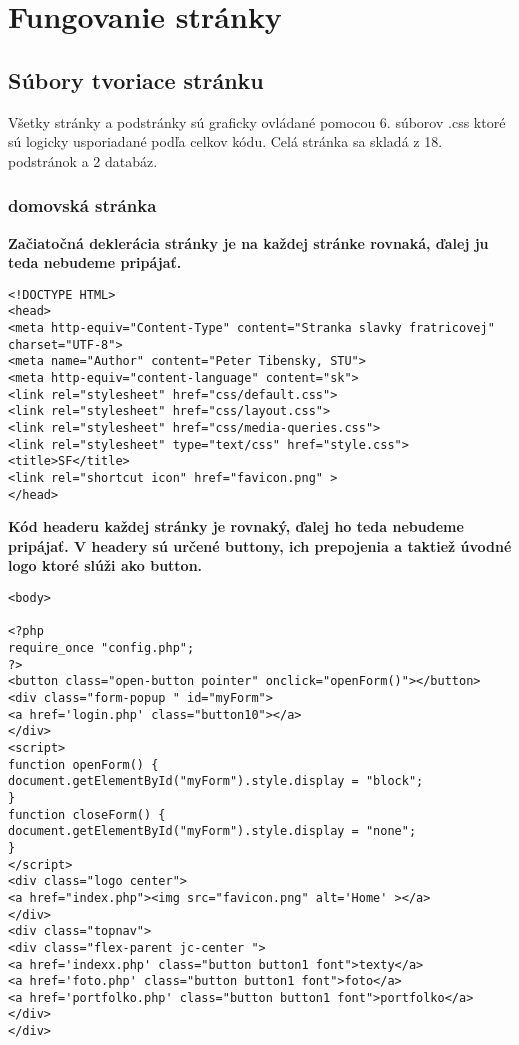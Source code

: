 \chapter{Fungovanie stránky}
\section{Súbory tvoriace stránku}

Všetky stránky a podstránky sú graficky ovládané pomocou 6. súborov .css ktoré sú logicky usporiadané podľa celkov kódu. Celá stránka sa skladá z 18. podstránok a 2 databáz.

\subsection{domovská stránka}
\vspace{0.5cm}
\textbf{Začiatočná deklerácia stránky je na každej stránke rovnaká, ďalej ju teda nebudeme pripájať.}
\vspace{0.5cm}
\begin{lstlisting}
<!DOCTYPE HTML>
<head>
<meta http-equiv="Content-Type" content="Stranka slavky fratricovej" charset="UTF-8">
<meta name="Author" content="Peter Tibensky, STU">
<meta http-equiv="content-language" content="sk">
<link rel="stylesheet" href="css/default.css">
<link rel="stylesheet" href="css/layout.css">
<link rel="stylesheet" href="css/media-queries.css">
<link rel="stylesheet" type="text/css" href="style.css">
<title>SF</title>
<link rel="shortcut icon" href="favicon.png" >
</head>
\end{lstlisting}
\vspace{0.5cm}
\textbf{Kód headeru každej stránky je rovnaký, ďalej ho teda nebudeme pripájať. V headery sú určené buttony, ich prepojenia a taktiež úvodné logo ktoré slúži ako button.}
\vspace{0.5cm}
\begin{lstlisting}
<body>

<?php
require_once "config.php";
?>
<button class="open-button pointer" onclick="openForm()"></button>
<div class="form-popup " id="myForm">
<a href='login.php' class="button10"></a>
</div>
<script>
function openForm() {
document.getElementById("myForm").style.display = "block";
}
function closeForm() {
document.getElementById("myForm").style.display = "none";
}
</script>
<div class="logo center">
<a href="index.php"><img src="favicon.png" alt='Home' ></a>
</div>
<div class="topnav">
<div class="flex-parent jc-center ">
<a href='indexx.php' class="button button1 font">texty</a>
<a href='foto.php' class="button button1 font">foto</a>
<a href='portfolko.php' class="button button1 font">portfolko</a>
</div>
</div>

\end{lstlisting}
